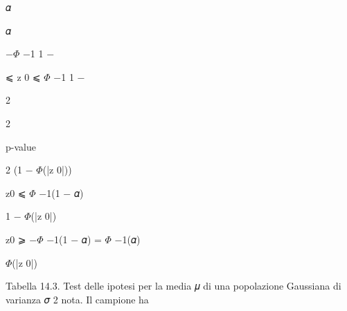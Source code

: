\documentclass[a4paper,portrait,12pt]{article}
\begin{document}
\begin{flushleft}
𝛼
\end{flushleft}


\begin{flushleft}
𝛼
\end{flushleft}


\begin{flushleft}
$-$$\Phi$ $-$1 1 $-$
\end{flushleft}


\begin{flushleft}
⩽ z 0 ⩽ $\Phi$ $-$1 1 $-$
\end{flushleft}


2


2





\begin{flushleft}
p-value
\end{flushleft}


\begin{flushleft}
2 (1 $-$ $\Phi$(|z 0|))
\end{flushleft}





\begin{flushleft}
z0 ⩽ $\Phi$ $-$1(1 $-$ 𝛼)
\end{flushleft}





\begin{flushleft}
1 $-$ $\Phi$(|z 0|)
\end{flushleft}





\begin{flushleft}
z0 ⩾ $-$$\Phi$ $-$1(1 $-$ 𝛼) = $\Phi$ $-$1(𝛼)
\end{flushleft}





\begin{flushleft}
$\Phi$(|z 0|)
\end{flushleft}





\begin{flushleft}
Tabella 14.3. Test delle ipotesi per la media 𝜇 di una popolazione Gaussiana di varianza 𝜎 2 nota. Il campione ha
\end{flushleft}
\end{document}
